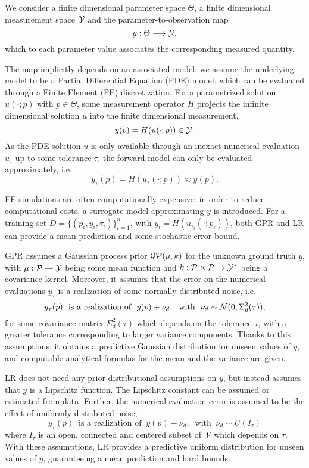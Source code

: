 We consider a finite dimensional parameter space $\Theta$, a finite dimensional measurement space $ \mathcal Y$ and the parameter-to-observation map 
\[
 y : \Theta \longrightarrow \mathcal Y, 
\]
which to each parameter value associates the corresponding measured quantity.

The map implicitly depends on an associated model: we assume the underlying model to be a Partial Differential Equation (PDE) model, which can be evaluated through a Finite Element (FE) discretization.
For a parametrized solution $u(\cdot;p)$ with $p\in \Theta$, some measurement operator $H$ projects the infinite dimensional solution $u$ into the finite dimensional measurement, 
\[
    y (p) = H(u(\cdot;p)) \in \mathcal Y.
\]
As the PDE solution $u$ is only available through an inexact numerical evaluation $u_\tau$ up to some tolerance $\tau$, the forward model can only be evaluated approximately, i.e.
\[
    y_\tau (p) = H(u_\tau(\cdot;p)) \approx y(p).
\]

FE simulations are often computationally expensive: in order to reduce computational costs, a surrogate model approximating $y$ is introduced.
For a training set $D = \{(p_i,y_i,\tau_i)\}_{i=1}^n$, with $y_i = H(u_{\tau_i}(\cdot;p_i))$, both GPR and LR can provide a mean prediction and some stochastic error bound. 

GPR assumes a Gaussian process prior $\mathcal G \mathcal P (\mu, k)$ for the unknown ground truth $y$, with $\mu : \mathcal P \rightarrow \mathcal Y$ being some mean function and $k: \mathcal P \times \mathcal P \rightarrow \mathcal Y^* $ being a covariance kernel.
Moreover, it assumes that the error on the numerical evaluations $y_\tau$ is a realization of some normally distributed noise, i.e. 
\begin{equation}\label{eq:GPR-noise}
    y_\tau(p) \ \text{ is a realization of } \ y(p) + \nu_d,  \ \text{ with } \ \nu_d \sim \mathcal N (0, \Sigma_d^2(\tau)),    
\end{equation}
for some covariance matrix $\Sigma_d^2(\tau)$ which depends on the tolerance $\tau$, with a greater tolerance corresponding to larger variance components.
Thanks to this assumptions, it obtains a predictive Gaussian distribution for unseen values of $y$, and computable analytical formulas for the mean and the variance are given.

LR does not need any prior distributional assumptions on $y$, but instead assumes that $y$ is a Lipschitz function.
The Lipschitz constant can be assumed or estimated from data.
Further, the numerical evaluation error is assumed to be the effect of uniformly distributed noise,  
\begin{equation}\label{eq:LR-noise}
    y_\tau(p) \ \text{ is a realization of } \ y(p) + \nu_d,  \ \text{ with } \ \nu_d \sim U(I_\tau )    
\end{equation}
where $I_\tau$ is an open, connected and centered subset of $\mathcal Y$ which depends on $\tau$.
With these assumptions, LR provides a predictive uniform distribution for unseen values of $y$, guaranteeing a mean prediction and hard bounds.\medskip

